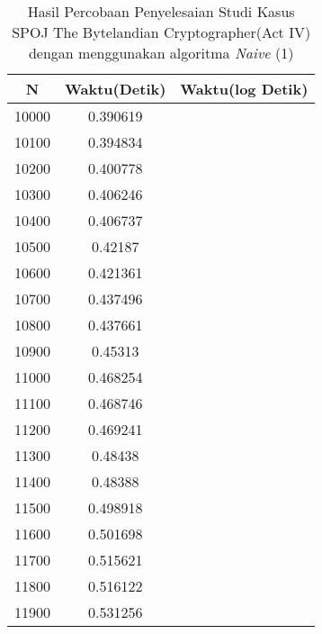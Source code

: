 \begin{table}[H]
\centering
\caption {Hasil Percobaan Penyelesaian Studi Kasus SPOJ The Bytelandian Cryptographer(Act IV) dengan menggunakan algoritma \textit{Naive} (1)}
\begin{tabular}{|c|c|c|}\hline
N&Waktu(Detik)&Waktu(log Detik)\\ \hline
10000&0.390619\\ \hline
10100&0.394834\\ \hline
10200&0.400778\\ \hline
10300&0.406246\\ \hline
10400&0.406737\\ \hline
10500&0.42187\\ \hline
10600&0.421361\\ \hline
10700&0.437496\\ \hline
10800&0.437661\\ \hline
10900&0.45313\\ \hline
11000&0.468254\\ \hline
11100&0.468746\\ \hline
11200&0.469241\\ \hline
11300&0.48438\\ \hline
11400&0.48388\\ \hline
11500&0.498918\\ \hline
11600&0.501698\\ \hline
11700&0.515621\\ \hline
11800&0.516122\\ \hline
11900&0.531256\\ \hline
\end{tabular}
\label{tab:res2}
\end{table}
